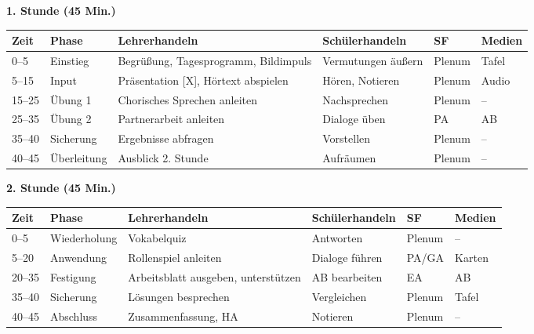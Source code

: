 \documentclass[11pt,a4paper]{article}
\begin{document}
\textbf{1. Stunde (45 Min.)}

\begin{longtable}{|p{1cm}|p{1.5cm}|p{4cm}|p{3cm}|p{2cm}|p{2cm}|}
\hline
\textbf{Zeit} & \textbf{Phase} & \textbf{Lehrerhandeln} & \textbf{Schülerhandeln} & \textbf{SF} & \textbf{Medien} \\
\hline
\endhead

0--5 & Einstieg & Begrüßung, Tages\-programm, Bildimpuls & Vermutungen äußern & Plenum & Tafel \\
\hline

5--15 & Input & Präsentation [X], Hörtext abspielen & Hören, Notieren & Plenum & Audio \\
\hline

15--25 & Übung 1 & Chorisches Sprechen anleiten & Nachsprechen & Plenum & -- \\
\hline

25--35 & Übung 2 & Partnerarbeit anleiten & Dialoge üben & PA & AB \\
\hline

35--40 & Sicherung & Ergebnisse abfragen & Vorstellen & Plenum & -- \\
\hline

40--45 & Über\-leitung & Ausblick 2. Stunde & Aufräumen & Plenum & -- \\
\hline
\end{longtable}

\vspace{1em}

\textbf{2. Stunde (45 Min.)}

\begin{longtable}{|p{1cm}|p{1.5cm}|p{4cm}|p{3cm}|p{2cm}|p{2cm}|}
\hline
\textbf{Zeit} & \textbf{Phase} & \textbf{Lehrerhandeln} & \textbf{Schülerhandeln} & \textbf{SF} & \textbf{Medien} \\
\hline
\endhead

0--5 & Wieder\-holung & Vokabelquiz & Antworten & Plenum & -- \\
\hline

5--20 & Anwen\-dung & Rollenspiel anleiten & Dialoge führen & PA/GA & Karten \\
\hline

20--35 & Festigung & Arbeitsblatt ausgeben, unterstützen & AB bearbeiten & EA & AB \\
\hline

35--40 & Sicherung & Lösungen besprechen & Vergleichen & Plenum & Tafel \\
\hline

40--45 & Abschluss & Zusammenfassung, HA & Notieren & Plenum & -- \\
\hline
\end{longtable}
\end{document}
